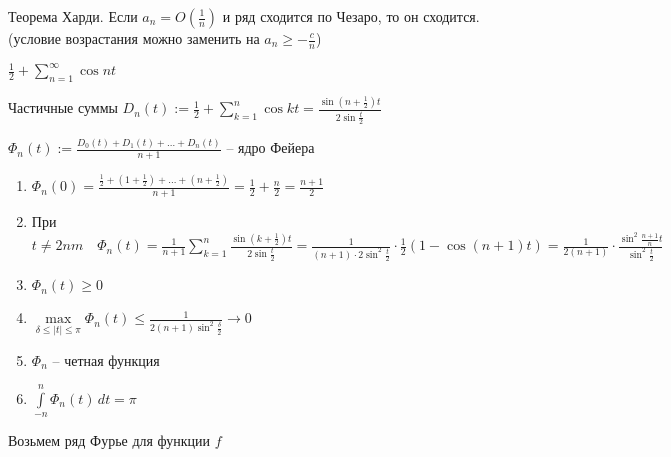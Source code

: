 \begin{remark}\thmslashn

	Теорема Харди. Если $a_n = O(\frac{1}{n})$ и ряд сходится по Чезаро, то он сходится. (условие возрастания можно заменить на $a_n \geqslant - \frac{c}{n}$)

\end{remark}

\begin{example}\thmslashn
	
	$\frac{1}{2} + \sum\limits_{n = 1}^{\infty} \cos nt$
	
	Частичные суммы $D_n(t) := \frac{1}{2} + \sum\limits_{k = 1}^n \cos kt = \frac{\sin\left(n+\frac{1}{2}\right) t}{2 \sin \frac{t}{2}}$
	
	$\Phi_n(t) := \frac{D_0(t) + D_1(t) + \ldots + D_n(t)}{n+1}$ -- ядро Фейера
	
\end{example}

\begin{consequences}\thmslashn
	
	\begin{enumerate}
		\item 
		$\Phi_n(0) = \frac{\frac{1}{2} + \left(1 + \frac{1}{2}\right) + \ldots + \left(n + \frac{1}{2}\right)}{n+1} = \frac{1}{2} + \frac{n}{2} = \frac{n+1}{2}$
		
		\item
		При $t \not = 2nm \quad \Phi_n(t) = \frac{1}{n+1}\sum\limits_{k = 1}^{n}\frac{\sin(k + \frac{1}{2})t}{2 \sin \frac{t}{2}} = \frac{1}{(n+1)\cdot 2 \sin^2\frac{t}{2}} \cdot \frac{1}{2}(1 - \cos(n+1)t) = \frac{1}{2(n+1)}\cdot \frac{\sin^2 \frac{n+1}{n}t}{\sin^2 \frac{t}{2}}$
		
		\item
		$\Phi_n(t) \geqslant 0$
		
		\item
		$\max\limits_{\delta \leqslant |t| \leqslant \pi} \Phi_n(t) \leqslant \frac{1}{2(n+1) \sin^2\frac{\delta}{2}} \to 0$
		
		\item
		$\Phi_n$ -- четная функция
		
		\item
		$\int\limits_{-n}^n \Phi_n(t)\,dt = \pi$
		
	\end{enumerate}
	
\end{consequences}

Возьмем ряд Фурье для функции $f$

